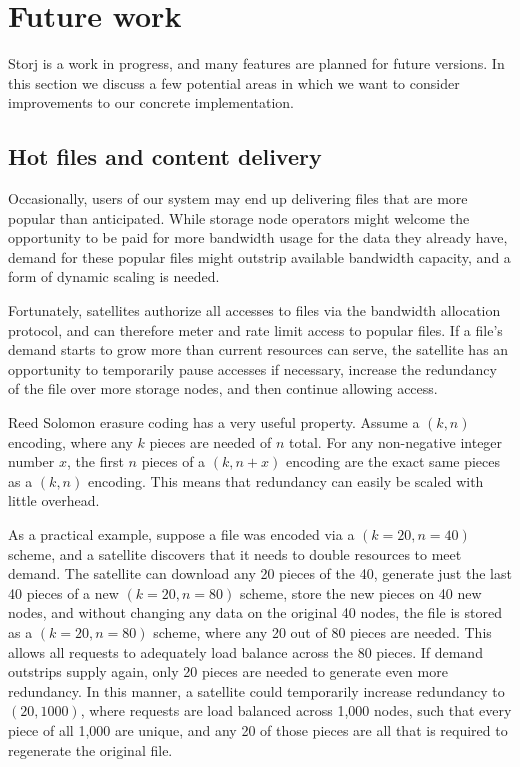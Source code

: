 \documentclass[11pt,fleqn,openany]{book}
\begin{document}
\chapter{Future work}\label{chap:future-work}

Storj is a work in progress, and many features are planned for future
versions. In this section we discuss a few potential areas in which we want to
consider improvements to our concrete implementation.

\section{Hot files and content delivery}\label{sec:future-hot-files}

Occasionally, users of our system may end up delivering files that are more
popular than anticipated. While storage node operators might welcome the
opportunity to be paid for more bandwidth usage for the data they already have,
demand for these popular files might outstrip available bandwidth capacity,
and a form of dynamic scaling is needed.

Fortunately, satellites authorize all accesses to files via the bandwidth
allocation protocol, and can therefore meter and rate limit access to popular
files. If a file's demand starts to grow more than current resources can serve,
the satellite has an opportunity to temporarily pause accesses if necessary,
increase the redundancy of the file over more storage nodes, and then continue
allowing access.

Reed Solomon erasure coding has a very useful property. Assume a $(k, n)$
encoding, where any $k$ pieces are needed of $n$ total. For any non-negative
integer number $x$, the first $n$ pieces of a $(k, n+x)$ encoding are the exact
same pieces as a $(k, n)$ encoding. This means that redundancy can easily be
scaled with little overhead.

As a practical example, suppose a file was encoded via a $(k=20, n=40)$ scheme,
and a satellite discovers that it needs to double resources to meet demand.
The satellite can download any 20 pieces of the 40, generate just the last 40
pieces of a new $(k=20, n=80)$ scheme, store the new pieces on 40 new nodes,
and without changing any data on the original 40 nodes, the file is stored
as a $(k=20, n=80)$ scheme, where any 20 out of 80 pieces are needed.
This allows all requests to adequately load balance across the 80 pieces.
If demand outstrips supply again, only 20 pieces are needed to generate even
more redundancy. In this manner, a satellite could temporarily increase
redundancy to $(20, 1000)$, where requests are load balanced across 1,000 nodes,
such that every piece of all 1,000 are unique, and any 20 of those pieces are
all that is required to regenerate the original file.
\end{document}
